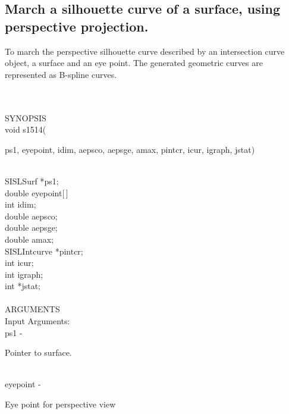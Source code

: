 \subsection{\sloppy March a silhouette curve of a surface, using
perspective \mbox{projection}.}
\begin{minipg1}
  To march the perspective silhouette curve described by an intersection
  curve object, a surface and an eye point.
  The generated geometric curves are represented as B-spline curves.
\end{minipg1} \\ \\
SYNOPSIS\\
        \>void s1514(\begin{minipg3}
          {\fov ps1},  {\fov eyepoint},  {\fov idim},  {\fov aepsco},  {\fov aepsge},  {\fov amax},  {\fov pintcr},  {\fov icur},  {\fov igraph},  {\fov jstat})
        \end{minipg3}\\[0.3ex]
        \>\>    SISLSurf \> *{\fov ps1};\\
        \>\>    double   \> {\fov eyepoint}[\,]\\
        \>\>    int      \> {\fov idim};\\
        \>\>    double   \> {\fov aepsco};\\
        \>\>    double   \> {\fov aepsge};\\
        \>\>    double   \> {\fov amax};\\
        \>\>    SISLIntcurve \> *{\fov pintcr};\\
        \>\>    int      \> {\fov icur};\\
        \>\>    int      \> {\fov igraph};\\
        \>\>    int      \> *{\fov jstat};\\
\\
ARGUMENTS\\
        \>Input Arguments:\\
        \>\>    {\fov ps1}\> - \>  \begin{minipg2}
                     Pointer to surface.
                               \end{minipg2}\\
        \>\>    {\fov eyepoint}\> - \>  \begin{minipg2}
                     Eye point for perspective view
                               \end{minipg2}\\
